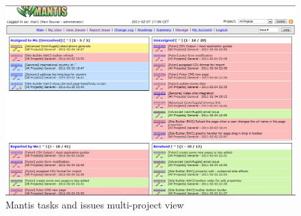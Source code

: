 \begin{figure}[!ht]
\centering
\includegraphics[width=.85\textwidth]{img/mantis.png}
\caption{Mantis tasks and issues multi-project view}
\label{figure:mantis}
\end{figure}
 

